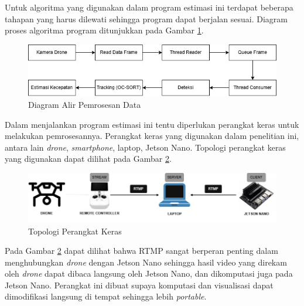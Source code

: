 Untuk algoritma yang digunakan dalam program estimasi ini terdapat beberapa tahapan yang harus dilewati sehingga program dapat berjalan sesuai. Diagram proses algoritma program ditunjukkan pada Gambar \ref{fig:diagramproses}.

\begin{figure} [H] \centering
  \includegraphics[scale=0.7]{bab3/algoritma.jpg}
  \caption{Diagram Alir Pemrosesan Data}
  \label{fig:diagramproses}
\end{figure}

Dalam menjalankan program estimasi ini tentu diperlukan perangkat keras untuk melakukan pemrosesannya. Perangkat keras yang digunakan dalam penelitian ini, antara lain \emph{drone}, \emph{smartphone}, laptop, Jetson Nano. Topologi perangkat keras yang digunakan dapat dilihat pada Gambar \ref{fig:topologihardware}.

\begin{figure} [H] \centering
  \includegraphics[scale=0.5]{bab3/topologi-hardware.jpg}
  \caption{Topologi Perangkat Keras}
  \label{fig:topologihardware}
\end{figure}

Pada Gambar \ref{fig:topologihardware} dapat dilihat bahwa RTMP sangat berperan penting dalam menghubungkan \emph{drone} dengan Jetson Nano sehingga hasil video yang direkam oleh \emph{drone} dapat dibaca langsung oleh Jetson Nano, dan dikomputasi juga pada Jetson Nano. Perangkat ini dibuat supaya komputasi dan visualisasi dapat dimodifikasi langsung di tempat sehingga lebih \emph{portable}.





